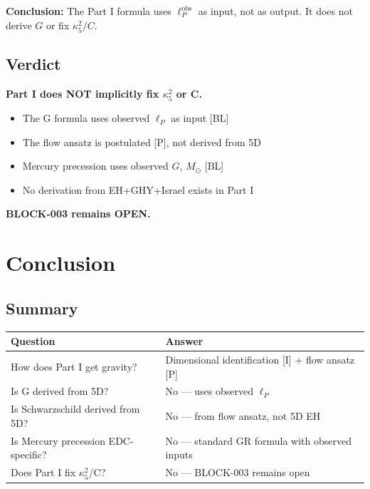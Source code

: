 \documentclass[11pt,a4paper]{article}
\begin{document}
\textbf{Conclusion:} The Part I formula uses $\ell_P^{\text{obs}}$ as input, not as output. It does not derive $G$ or fix $\kappa_5^2/C$.

\subsection{Verdict}

\begin{tcolorbox}[colback=red!10,colframe=red!60!black,title=BLOCK-003 Status]
\textbf{Part I does NOT implicitly fix $\kappa_5^2$ or C.}

\begin{itemize}
    \item The G formula uses observed $\ell_P$ as input [BL]
    \item The flow ansatz is postulated [P], not derived from 5D
    \item Mercury precession uses observed $G$, $M_\odot$ [BL]
    \item No derivation from EH+GHY+Israel exists in Part I
\end{itemize}

\textbf{BLOCK-003 remains OPEN.}
\end{tcolorbox}

\section{Conclusion}
\label{sec:conclusion}

\subsection{Summary}

\begin{center}
\begin{tabular}{|l|l|}
\hline
\textbf{Question} & \textbf{Answer} \\
\hline
How does Part I get gravity? & Dimensional identification [I] + flow ansatz [P] \\
Is G derived from 5D? & No --- uses observed $\ell_P$ \\
Is Schwarzschild derived from 5D? & No --- from flow ansatz, not 5D EH \\
Is Mercury precession EDC-specific? & No --- standard GR formula with observed inputs \\
Does Part I fix $\kappa_5^2$/C? & No --- BLOCK-003 remains open \\
\hline
\end{tabular}
\end{center}
\end{document}
